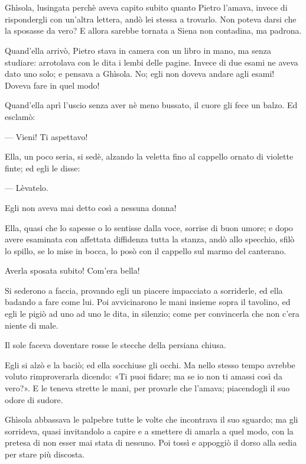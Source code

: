\chapter{}

Ghìsola, lusingata perchè aveva capito subito quanto Pietro l’amava, invece di rispondergli con un’altra lettera, andò lei stessa a trovarlo. Non poteva darsi che la sposasse da vero? E allora sarebbe tornata a Siena non contadina, ma padrona.

Quand’ella arrivò, Pietro stava in camera con un libro in mano, ma senza studiare: arrotolava con le dita i lembi delle pagine. Invece di due esami ne aveva dato uno solo; e pensava a Ghìsola. No; egli non doveva andare agli esami! Doveva fare in quel modo!

Quand’ella aprì l’uscio senza aver nè meno bussato, il cuore gli fece un balzo. Ed esclamò:

— Vieni! Ti aspettavo!

Ella, un poco seria, si sedè, alzando la veletta fino al cappello ornato di violette finte; ed egli le disse:

— Lèvatelo.

Egli non aveva mai detto così a nessuna donna!

Ella, quasi che lo sapesse o lo sentisse dalla voce, sorrise di buon umore; e dopo avere esaminata con affettata diffidenza tutta la stanza, andò allo specchio, sfilò lo spillo, se lo mise in bocca, lo posò con il cappello sul marmo del canterano.

Averla sposata subito! Com’era bella!

Si sederono a faccia, provando egli un piacere impacciato a sorriderle, ed ella badando a fare come lui. Poi avvicinarono le mani insieme sopra il tavolino, ed egli le pigiò ad uno ad uno le dita, in silenzio; come per convincerla che non c’era niente di male.

Il sole faceva doventare rosse le stecche della persiana chiusa.

Egli si alzò e la baciò; ed ella socchiuse gli occhi. Ma nello stesso tempo avrebbe voluto rimproverarla dicendo: «Ti puoi fidare; ma se io non ti amassi così da vero?». E le teneva strette le mani, per provarle che l’amava; piacendogli il suo odore di sudore.

Ghìsola abbassava le palpebre tutte le volte che incontrava il suo sguardo; ma gli sorrideva, quasi invitandolo a capire e a smettere di amarla a quel modo, con la pretesa di non esser mai stata di nessuno. Poi tossì e appoggiò il dorso alla sedia per stare più discosta.

